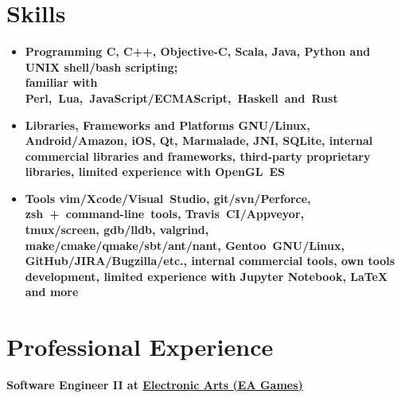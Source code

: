\section*{Skills}

\begin{itemize}[rightmargin=\dimexpr\linewidth-17.5cm-\leftmargin\relax]
    \item \bfseries Programming\mdseries
        \subitem
        C,
        \bfseries C++\mdseries,
        Objective-C,
        \bfseries Scala\mdseries,
        Java,
        \bfseries Python \mdseries and UNIX \bfseries shell/bash \mdseries scripting;\\
        familiar with Perl,~Lua,~JavaScript/ECMAScript,~Haskell~and~\bfseries Rust\mdseries

    \vspace{0.4cm}
    \item \bfseries Libraries, Frameworks and Platforms\mdseries
        \subitem
        \bfseries GNU/Linux\mdseries,
        Android/Amazon,
        iOS,
        \bfseries Qt\mdseries,
        Marmalade,
        JNI,
        SQLite,
        internal commercial libraries and frameworks,
        third-party proprietary libraries,
        limited experience with OpenGL~ES

    \vspace{0.4cm}
    \item \bfseries Tools\mdseries
        \subitem
        \bfseries vim\mdseries/Xcode/Visual~Studio,
        \bfseries git\mdseries/svn/Perforce,
        zsh~+~command-line~tools,
        \bfseries Travis~CI\mdseries/Appveyor,\\
        tmux/screen,
        \bfseries gdb\mdseries/lldb,
        valgrind,
        make/cmake/qmake/sbt/ant/nant,
        \bfseries Gentoo~\mdseries GNU/Linux,\\
        \bfseries GitHub\mdseries/JIRA/Bugzilla/etc.,
        internal commercial tools,
        own \bfseries tools development\mdseries,
        limited experience with \bfseries Jupyter \mdseries Notebook,
        {\LaTeX }
        and more
\end{itemize}

\section*{Professional Experience}
{
\fontsize{12pt}{12pt}\selectfont
\bfseries Software Engineer II at
\href{http://www.ea.com}{Electronic Arts (EA Games)}
\mdseries
}

